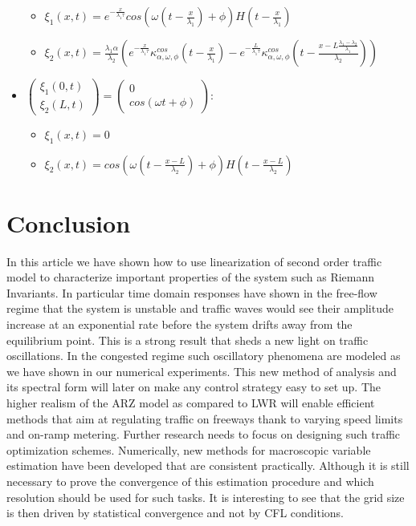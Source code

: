 \documentclass[preprint]{elsarticle}
\begin{document}
\begin{itemize}
\begin{itemize}
\item $\xi_{1}\left(x,t\right)=e^{-\frac{x}{\lambda_{1}\tau}}cos\left(\omega\left(t-\frac{x}{\lambda_{1}}\right)+\phi\right)H\left(t-\frac{x}{\lambda_{1}}\right)$
\item $\xi_{2}\left(x,t\right)=\frac{\lambda_{1}\alpha}{\lambda_{2}}\left(e^{-\frac{x}{\lambda_{1}\tau}}\kappa_{\alpha,\omega,\phi}^{cos}\left(t-\frac{x}{\lambda_{1}}\right)-e^{-\frac{L}{\lambda_{1}\tau}}\kappa_{\alpha,\omega,\phi}^{cos}\left(t-\frac{x-L\frac{\lambda_{1}-\lambda_{2}}{\lambda_{1}}}{\lambda_{2}}\right)\right)$
\end{itemize}
\item $\left(\begin{array}{c}
\xi_{1}\left(0,t\right)\\
\xi_{2}\left(L,t\right)
\end{array}\right)=\left(\begin{array}{c}
0\\
cos\left(\omega t+\phi\right)
\end{array}\right)$:

\begin{itemize}
\item $\xi_{1}\left(x,t\right)=0$
\item $\xi_{2}\left(x,t\right)=cos\left(\omega\left(t-\frac{x-L}{\lambda_{2}}\right)+\phi\right)H\left(t-\frac{x-L}{\lambda_{2}}\right)$\end{itemize}
\end{itemize}

\section{Conclusion}
In this article we have shown how to use linearization of second order traffic model to characterize important properties of the system such as Riemann Invariants. In particular time domain responses have shown in the free-flow regime that the system is unstable and traffic waves would see their amplitude increase at an exponential rate before the system drifts away from the equilibrium point. This is a strong result that sheds a new light on traffic oscillations. In the congested regime such oscillatory phenomena are modeled as we have shown in our numerical experiments. This new method of analysis and its spectral form will later on make any control strategy easy to set up. The higher realism of the ARZ model as compared to LWR will enable efficient methods that aim at regulating traffic on freeways thank to varying speed limits and on-ramp metering. Further research needs to focus on designing such traffic optimization schemes. Numerically, new methods for macroscopic variable estimation have been developed that are consistent practically. Although it is still necessary to prove the convergence of this estimation procedure and which resolution should be used for such tasks. It is interesting to see that the grid size is then driven by statistical convergence and not by CFL conditions.
\end{document}
